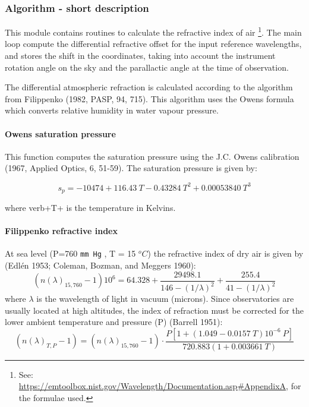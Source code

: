 \subsubsection{Algorithm - short description}

This module contains routines to calculate the refractive index of air \footnote{See: \url{https://emtoolbox.nist.gov/Wavelength/Documentation.asp\#AppendixA}, for the formulae used.}. 
The main loop compute the differential refractive offset for the input reference wavelengths, and stores the shift in the coordinates, taking into account the instrument rotation angle 
on the sky and the parallactic angle at the time of observation.

The differential atmospheric refraction is calculated according to the algorithm from Filippenko (1982, PASP, 94, 715). This algorithm uses the Owens formula 
which converts relative humidity in water vapour pressure. 


\paragraph{Owens saturation pressure}

This function computes the saturation pressure using the J.C. Owens calibration (1967, Applied Optics, 6, 51-59). 
The saturation pressure is given by:

\begin{equation}
s_p = -10474 +116.43\ T -0.43284\ T^2 +0.00053840\ T^3
\label{eq:owens}
\end{equation}

where verb+T+ is the temperature in Kelvins.


\paragraph{Filippenko refractive index}

At sea level (P=760 \verb+mm Hg+ , T = 15 $^oC$) the refractive index of dry air is given by (Edl\'en 1953; Coleman, Bozman, and Meggers 1960):
\begin{equation}
(n( \lambda )_{15,760}-1)10^6 = 64.328 + \frac{29498.1}{146-(1/ \lambda )^2} +\frac{255.4}{41-(1/ \lambda )^2}
\end{equation}
where $\lambda$ is the wavelength of light in vacuum (microns). Since observatories are usually located at high altitudes, the index of refraction must be corrected for the 
lower ambient temperature and pressure (P) (Barrell 1951):
\begin{equation}
(n(\lambda)_{T,P} -1) = (n(\lambda)_{15,760} - 1) \cdot \frac{P[1+(1.049-0.0157\ T) 10^{-6}\ P]}{720.883 (1+0.003661\ T)}
\end{equation}

